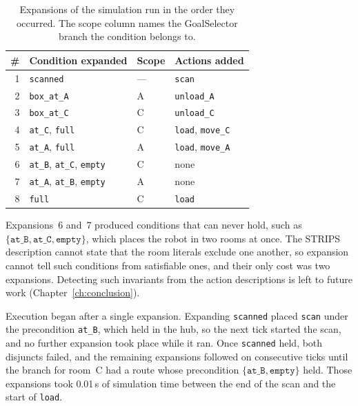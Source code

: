     \begin{table}[htbp]
        \centering
        \caption[Expansions of the simulation run]{Expansions of the simulation run in the order they occurred. The scope column names the GoalSelector branch the condition belongs to.}
        \label{tab:sim_expansions}
        \begin{tabular}{@{}rlll@{}}
            \toprule
            \# & Condition expanded & Scope & Actions added \\
            \midrule
            1 & \texttt{scanned}                               & ---  & \texttt{scan} \\
            2 & \texttt{box\_at\_A}                            & A    & \texttt{unload\_A} \\
            3 & \texttt{box\_at\_C}                            & C    & \texttt{unload\_C} \\
            4 & \texttt{at\_C}, \texttt{full}                  & C    & \texttt{load}, \texttt{move\_C} \\
            5 & \texttt{at\_A}, \texttt{full}                  & A    & \texttt{load}, \texttt{move\_A} \\
            6 & \texttt{at\_B}, \texttt{at\_C}, \texttt{empty} & C    & none \\
            7 & \texttt{at\_A}, \texttt{at\_B}, \texttt{empty} & A    & none \\
            8 & \texttt{full}                                  & C    & \texttt{load} \\
            \bottomrule
        \end{tabular}
    \end{table}

    Expansions~6 and~7 produced conditions that can never hold, such as $\{\texttt{at\_B}, \texttt{at\_C}, \texttt{empty}\}$, which places the robot in two rooms at once.
    The STRIPS description cannot state that the room literals exclude one another, so expansion cannot tell such conditions from satisfiable ones, and their only cost was two expansions.
    Detecting such invariants from the action descriptions is left to future work (Chapter~\ref{ch:conclusion}).

    Execution began after a single expansion.
    Expanding \texttt{scanned} placed \texttt{scan} under the precondition \texttt{at\_B}, which held in the hub, so the next tick started the scan, and no further expansion took place while it ran.
    Once \texttt{scanned} held, both disjuncts failed, and the remaining expansions followed on consecutive ticks until the branch for room~C had a route whose precondition $\{\texttt{at\_B}, \texttt{empty}\}$ held.
    Those expansions took 0.01\,s of simulation time between the end of the scan and the start of \texttt{load}.

